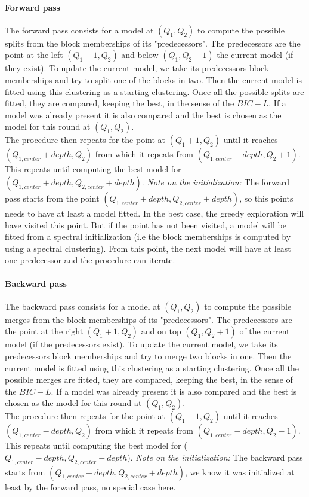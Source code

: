 \documentclass[12pt,a4paper]{report}
\begin{document}
\paragraph*{Forward pass} The forward pass consists for a model at $(Q_1, Q_2)$ 
to compute the possible splits from the block memberships of its "predecessors". 
The predecessors are the point at the left $(Q_1 - 1, Q_2)$ and below 
$(Q_1, Q_2 - 1)$ the current model (if they exist). To update the current model,
we take its predecessors block memberships and try to split one of the blocks in
two. Then the current model is fitted using this clustering as a starting 
clustering. Once all the possible splits are fitted, they are compared, keeping 
the best, in the sense of the $BIC-L$. If a model was already present it is also
compared and the best is chosen as the model for this round at $(Q_1, Q_2)$.\\
The procedure then repeats for the point at $(Q_1 + 1, Q_2)$ until it reaches 
$(Q_{1,center} + depth, Q_2)$ from which it repeats from 
$(Q_{1,center} - depth, Q_2 + 1)$. This repeats until computing the best model
for $(Q_{1,center} + depth, Q_{2,center} + depth)$.
\textit{Note on the initialization:} The forward pass starts from the point 
$(Q_{1,center} + depth, Q_{2,center} + depth)$, so this points needs to have at 
least a model fitted. In the best case, the greedy exploration will have visited
this point. But if the point has not been visited, a model will be fitted from
a spectral initialization (i.e the block memberships is computed by using a 
spectral clustering). From this point, the next model will have at least one
predecessor and the procedure can iterate.

\paragraph*{Backward pass} The backward pass consists for a model at $(Q_1, Q_2)$ 
to compute the possible merges from the block memberships of its "predecessors". 
The predecessors are the point at the right $(Q_1 + 1, Q_2)$ and on top 
$(Q_1, Q_2 + 1)$ of the current model (if the predecessors exist). To update the
current model, we take its predecessors block memberships and try to merge two 
blocks in one. Then the current model is fitted using this clustering as
a starting clustering. Once all the possible merges are fitted, they are
compared, keeping the best, in the sense of the $BIC-L$.
If a model was already present it is also
compared and the best is chosen as the model for this round at $(Q_1, Q_2)$.\\
The procedure then repeats for the point at $(Q_1 - 1, Q_2)$ until it reaches 
$(Q_{1,center} - depth, Q_2)$ from which it repeats from 
$(Q_{1,center} - depth, Q_2 - 1)$. This repeats until computing the best model
for ($Q_{1,center} - depth, Q_{2,center} - depth$).
\textit{Note on the initialization:} The backward pass starts from
$(Q_{1,center} + depth, Q_{2,center} + depth)$, we know it was initialized at
least by the forward pass, no special case here.\\
\end{document}
